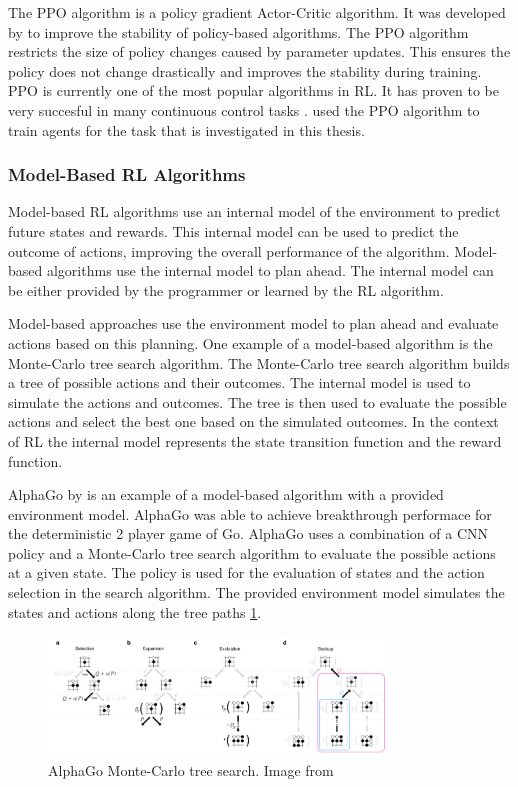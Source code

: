 The \ac{PPO} algorithm is a policy gradient Actor-Critic algorithm. It was developed by \textcite{ppo} to improve the stability of policy-based algorithms. The \ac{PPO} algorithm restricts the size of policy changes caused by parameter updates. This ensures the policy does not change drastically and improves the stability during training. \ac{PPO} is currently one of the most popular algorithms in \ac{RL}. It has proven to be very succesful in many continuous control tasks \autocite{ppo}. \textcite{maximilian} used the \ac{PPO} algorithm to train agents for the task that is investigated in this thesis.



\subsubsection{Model-Based \ac{RL} Algorithms}

Model-based \ac{RL} algorithms use an internal model of the environment to predict future states and rewards. This internal model can be used to predict the outcome of actions, improving the overall performance of the algorithm. Model-based algorithms use the internal model to plan ahead.
The internal model can be either provided by the programmer or learned by the \ac{RL} algorithm.


Model-based approaches use the environment model to plan ahead and evaluate actions based on this planning. One example of a model-based algorithm is the Monte-Carlo tree search algorithm. The Monte-Carlo tree search algorithm builds a tree of possible actions and their outcomes. The internal model is used to simulate the actions and outcomes. The tree is then used to evaluate the possible actions and select the best one based on the simulated outcomes. In the context of \ac{RL} the internal model represents the state transition function and the reward function. 


AlphaGo by \textcite{alphago} is an example of a model-based algorithm with a provided environment model. AlphaGo was able to achieve breakthrough performace for the deterministic 2 player game of Go. AlphaGo uses a combination of a \ac{CNN} policy and a Monte-Carlo tree search algorithm to evaluate the possible actions at a given state. The policy is used for the evaluation of states and the action selection in the search algorithm. The provided environment model simulates the states and actions along the tree paths \ref{fig:monecarlo}.

\begin{figure}
    \centering
    \includegraphics[width=0.8\textwidth]{Bilder/monte-carlo.png}
    \caption{AlphaGo Monte-Carlo tree search. Image from \autocite{alphago}}
    \label{fig:monecarlo}
\end{figure}

